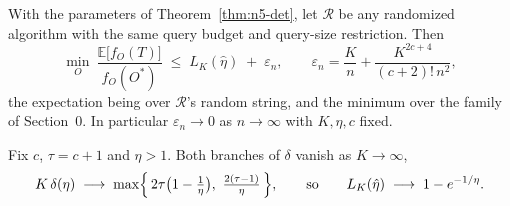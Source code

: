 \begin{corollary}\label{cor:n5-rand}
With the parameters of Theorem~\ref{thm:n5-det}, let $\mathcal R$ be any
randomized algorithm with the same query budget and query-size restriction.
Then
\[
  \min_{O}\ \frac{\mathbb E\bigl[f_O(T)\bigr]}{f_O(O^{\ast})}
  \;\le\;L_K(\hat\eta)\;+\;\varepsilon_n,
  \qquad
  \varepsilon_n=\frac{K}{n}+\frac{K^{2c+4}}{(c+2)!\,n^{2}},
\]
the expectation being over $\mathcal R$'s random string, and the minimum over
the family of Section~0.  In particular $\varepsilon_n\to0$ as $n\to\infty$
with $K,\eta,c$ fixed.
\end{corollary}

\begin{corollary}[Asymptotics in $K$]\label{cor:n5-asym}
Fix $c$, $\tau=c+1$ and $\eta>1$.  Both branches of $\delta$ vanish as
$K\to\infty$,
\[
  K\,\delta(\eta)\;\longrightarrow\;
  \max\Bigl\{\,2\tau\bigl(1-\tfrac1\eta\bigr),\ \tfrac{2(\tau-1)}{\eta}\,\Bigr\},
  \qquad\text{so}\qquad
  L_K(\hat\eta)\;\longrightarrow\;1-e^{-1/\eta}.
\]
\end{corollary}


